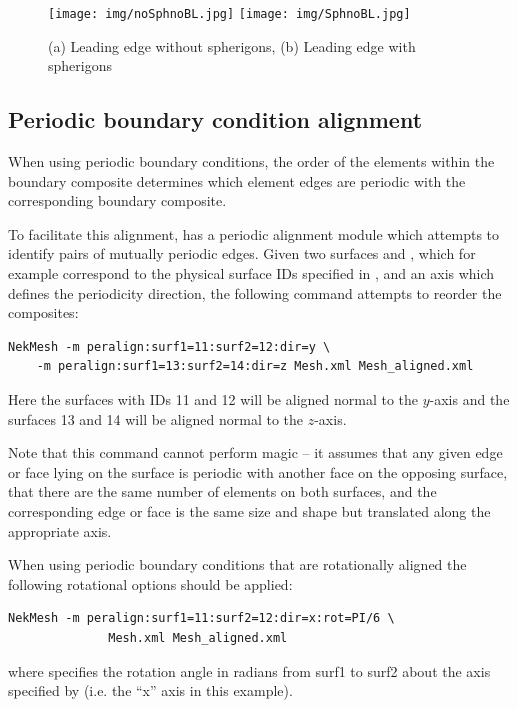 \begin{figure}[!htbp]
  \begin{center}
    \texttt{[image: img/noSphnoBL.jpg]}
    \texttt{[image: img/SphnoBL.jpg]}
    \caption{(a) Leading edge without spherigons, (b) Leading edge with
      spherigons}
  \end{center}
\end{figure}

\subsection{Periodic boundary condition alignment}

When using periodic boundary conditions, the order of the elements within the
boundary composite determines which element edges are periodic with the
corresponding boundary composite.

To facilitate this alignment, \nm has a periodic alignment module
which attempts to identify pairs of mutually periodic edges. Given two
surfaces  and , which for example correspond
to the physical surface IDs specified in \gmsh, and an axis which
defines the periodicity direction, the following command attempts to
reorder the composites:
%
\begin{lstlisting}[style=BashInputStyle]
NekMesh -m peralign:surf1=11:surf2=12:dir=y \
    -m peralign:surf1=13:surf2=14:dir=z Mesh.xml Mesh_aligned.xml
\end{lstlisting}
%
Here the surfaces with IDs 11 and 12 will be aligned normal to the $y$-axis and
the surfaces 13 and 14 will be aligned normal to the $z$-axis.

Note that this command cannot perform magic -- it assumes that any given edge or
face lying on the surface is periodic with another face on the opposing surface,
that there are the same number of elements on both surfaces, and the
corresponding edge or face is the same size and shape but translated along the
appropriate axis.


When using periodic boundary conditions that are rotationally aligned the
following rotational options should be applied:
%
\begin{lstlisting}[style=BashInputStyle]
NekMesh -m peralign:surf1=11:surf2=12:dir=x:rot=PI/6 \
              Mesh.xml Mesh_aligned.xml
\end{lstlisting}
%
where  specifies the rotation angle in radians from
surf1 to surf2 about the axis specified by  (i.e. the ``x'' axis in
this example).

